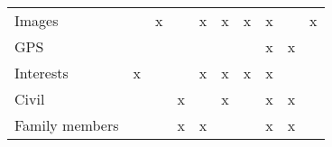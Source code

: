 \begin{table}
\begin{tabular}{llllllllll}
    Images          &     & x     &       & x     & x       & x     & x    &     & x   \\
    GPS             &     &       &       &       &         &       & x    & x   &     \\
    Interests       & x   &       &       & x     & x       & x     & x    &     &     \\
    Civil           &     &       & x     &       & x       &       & x    & x   &     \\
    Family members  &     &       & x     & x     &         &       & x    & x   &    
    \end{tabular}
\end{table}